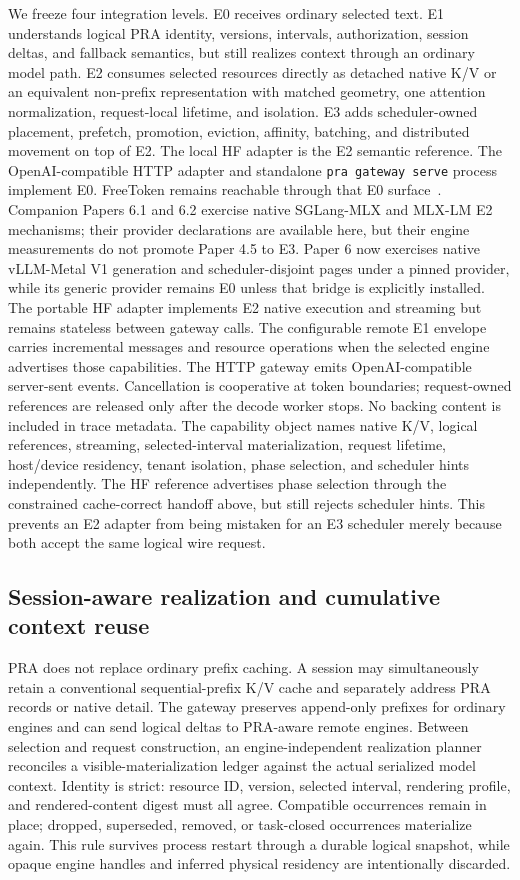 \documentclass[11pt]{article}
\begin{document}
We freeze four integration levels. E0 receives ordinary selected text. E1
understands logical PRA identity, versions, intervals, authorization, session
deltas, and fallback semantics, but still realizes context through an ordinary
model path. E2 consumes selected resources directly as detached native K/V or
an equivalent non-prefix representation with matched geometry, one attention
normalization, request-local lifetime, and isolation. E3 adds scheduler-owned
placement, prefetch, promotion, eviction, affinity, batching, and distributed
movement on top of E2. The local HF adapter is the E2 semantic reference. The OpenAI-compatible HTTP adapter and standalone
\texttt{pra gateway serve} process implement E0. FreeToken remains reachable
through that E0 surface~\cite{freetokenDocs2026}. Companion Papers 6.1 and 6.2
exercise native SGLang-MLX and MLX-LM E2 mechanisms; their provider declarations
are available here, but their engine measurements do not promote Paper 4.5 to
E3. Paper 6 now exercises native vLLM-Metal V1 generation and
scheduler-disjoint pages under a pinned provider, while its generic provider
remains E0 unless that bridge is explicitly installed. The portable
HF adapter implements E2 native execution and streaming but remains stateless
between gateway calls. The configurable remote E1 envelope carries incremental
messages and resource operations when the selected engine advertises those
capabilities. The HTTP gateway emits OpenAI-compatible server-sent events.
Cancellation is cooperative at token
boundaries; request-owned references are released only after the decode worker
stops. No backing content is included in trace metadata.
The capability object names native K/V, logical references, streaming,
selected-interval materialization, request lifetime, host/device residency,
tenant isolation, phase selection, and scheduler hints independently. The HF
reference advertises phase selection through the constrained cache-correct
handoff above, but still rejects scheduler hints. This prevents an E2 adapter
from being mistaken for an E3 scheduler merely because both accept the same
logical wire request.

\subsection{Session-aware realization and cumulative context reuse}

PRA does not replace ordinary prefix caching. A session may simultaneously
retain a conventional sequential-prefix K/V cache and separately address PRA
records or native detail. The gateway preserves append-only prefixes for
ordinary engines and can send logical deltas to PRA-aware remote engines.
Between selection and request construction, an engine-independent realization
planner reconciles a visible-materialization ledger against the actual
serialized model context. Identity is strict: resource ID, version, selected
interval, rendering profile, and rendered-content digest must all agree.
Compatible occurrences remain in place; dropped, superseded, removed, or
task-closed occurrences materialize again. This rule survives process restart
through a durable logical snapshot, while opaque engine handles and inferred
physical residency are intentionally discarded.
\end{document}
